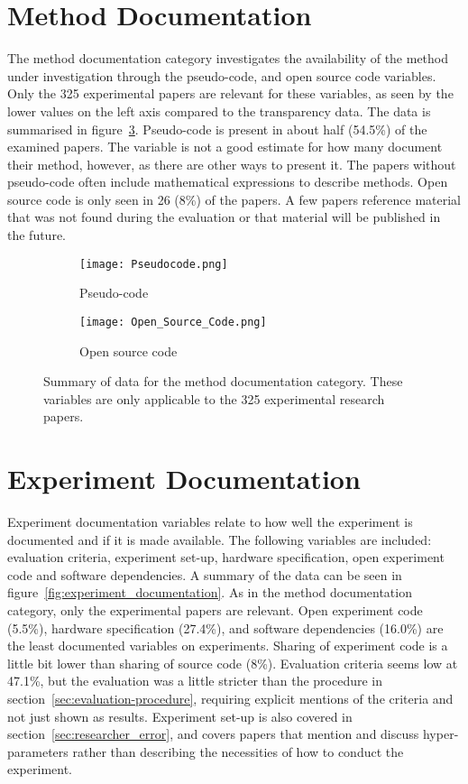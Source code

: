 \section{Method Documentation}
The method documentation category investigates the availability of the method under investigation through the pseudo-code, and open source code variables. Only the 325 experimental papers are relevant for these variables, as seen by the lower values on the left axis compared to the transparency data. The data is summarised in figure~\ref{fig:method_documentation}. Pseudo-code is present in about half (54.5\%) of the examined papers. The variable is not a good estimate for how many document their method, however, as there are other ways to present it. The papers without pseudo-code often include mathematical expressions to describe methods. Open source code is only seen in 26 (8\%) of the papers. A few papers reference material that was not found during the evaluation or that material will be published in the future.

\begin{figure}[!h]
\begin{center}
    \begin{subfigure}[b]{0.4\textwidth}
        \texttt{[image: Pseudocode.png]}
        \caption{Pseudo-code}
        \label{fig:pseudocode}
    \end{subfigure}
    \begin{subfigure}[b]{0.4\textwidth}
        \texttt{[image: Open\_Source\_Code.png]}
        \caption{Open source code}
        \label{fig:open_source_code}
    \end{subfigure}
    \caption[Summary of method documentation data.]{Summary of data for the method documentation category. These variables are only applicable to the 325 experimental research papers.}
    \label{fig:method_documentation}
\end{center}
\end{figure}

\section{Experiment Documentation}
Experiment documentation variables relate to how well the experiment is documented and if it is made available. The following variables are included: evaluation criteria, experiment set-up, hardware specification, open experiment code and software dependencies. A summary of the data can be seen in figure~\ref{fig:experiment_documentation}. As in the method documentation category, only the experimental papers are relevant. Open experiment code (5.5\%), hardware specification (27.4\%), and software dependencies (16.0\%) are the least documented variables on experiments. Sharing of experiment code is a little bit lower than sharing of source code (8\%). Evaluation criteria seems low at 47.1\%, but the evaluation was a little stricter than the procedure in section~\ref{sec:evaluation-procedure}, requiring explicit mentions of the criteria and not just shown as results. Experiment set-up is also covered in section~\ref{sec:researcher_error}, and covers papers that mention and discuss hyper-parameters rather than describing the necessities of how to conduct the experiment.

